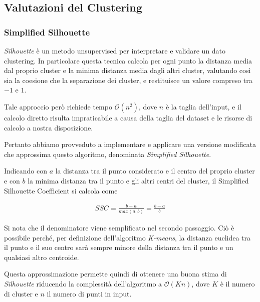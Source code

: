 \documentclass[
	11pt, %
	a4paper, %
	oneside, %
	headinclude,footinclude, %
	BCOR5mm, %
]{scrartcl}
\begin{document}
	\subsection{Valutazioni del Clustering}

		\subsubsection{Simplified Silhouette}
			\emph{Silhouette} è un metodo unsupervised per interpretare e validare un dato clustering.
			In particolare questa tecnica calcola per ogni punto la distanza media dal proprio cluster e la minima distanza media dagli altri cluster, valutando così sia la coesione che la separazione dei cluster, e restituisce un valore compreso tra $-1$ e $1$.

			Tale approccio però richiede tempo $\mathcal{O}(n^2)$, dove $n$ è la taglia dell'input, e il calcolo diretto risulta impraticabile a causa della taglia del dataset e le risorse di calcolo a nostra disposizione.

			Pertanto abbiamo provveduto a implementare e applicare una versione modificata che approssima questo algoritmo, denominata \emph{Simplified Silhouette}\cite{sscmapreduce}.

			Indicando con $a$ la distanza tra il punto considerato e il centro del proprio cluster e con $b$ la minima distanza tra il punto e gli altri centri del cluster, il {Simplified Silhouette Coefficient} si calcola come

			\begin{equation} \begin{aligned} \label{eq:simplifiedSilhouette}
				SSC = \frac{b - a}{ max(a, b) } = \frac{b - a}{b}
			\end{aligned} \end{equation}

			Si nota che il denominatore viene semplificato nel secondo passaggio.
			Ciò è possibile perché, per definizione dell'algoritmo \emph{K-means}, la distanza euclidea tra il punto e il suo centro sarà sempre minore della distanza tra il punto e un qualsiasi altro centroide.


			Questa approssimazione permette quindi di ottenere una buona stima di \emph{Silhouette}\cite{ssc} riducendo la complessità dell'algoritmo a $\mathcal{O}(Kn)$, dove $K$ è il numero di cluster e $n$ il numero di punti in input.
\end{document}
